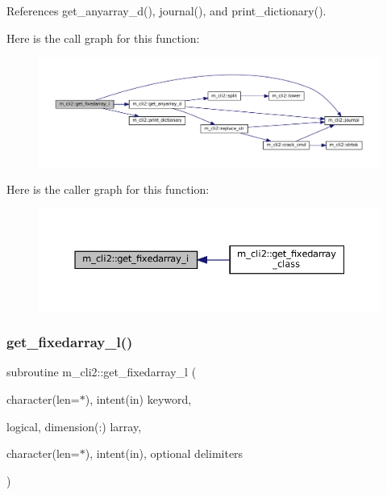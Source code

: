 References get\+\_\+anyarray\+\_\+d(), journal(), and print\+\_\+dictionary().

Here is the call graph for this function\+:\nopagebreak
\begin{figure}[H]
\begin{center}
\leavevmode
\includegraphics[width=350pt]{namespacem__cli2_aa469ba94e6bb122c9bf30dd8642b693b_cgraph}
\end{center}
\end{figure}
Here is the caller graph for this function\+:\nopagebreak
\begin{figure}[H]
\begin{center}
\leavevmode
\includegraphics[width=350pt]{namespacem__cli2_aa469ba94e6bb122c9bf30dd8642b693b_icgraph}
\end{center}
\end{figure}
\mbox{\label{namespacem__cli2_a65ffe8c7a444db5db3be3f6edecef008}} 
\subsubsection{\texorpdfstring{get\+\_\+fixedarray\+\_\+l()}{get\_fixedarray\_l()}}
{\footnotesize\ttfamily subroutine m\+\_\+cli2\+::get\+\_\+fixedarray\+\_\+l (\begin{DoxyParamCaption}\item[{character(len=$\ast$), intent(in)}]{keyword,  }\item[{logical, dimension(\+:)}]{larray,  }\item[{character(len=$\ast$), intent(in), optional}]{delimiters }\end{DoxyParamCaption})\hspace{0.3cm}{\ttfamily [private]}}



